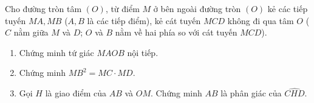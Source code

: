 \begin{ex}%
Cho đường tròn tâm $(O)$, từ điểm $M$ ở bên ngoài đường tròn $(O)$ kẻ các tiếp tuyến $MA, MB$ ($A, B$ là các tiếp điểm), kẻ cát tuyến $MCD$ không đi qua tâm $O$ ($C$ nằm giữa $M$ và $D$; $O$ và $B$ nằm về hai phía so với cát tuyến $MCD$).
\begin{enumerate}
	\item Chứng minh tứ giác $MAOB$ nội tiếp.
	\item Chứng minh $MB^2=MC \cdot MD$.
	\item Gọi $H$ là giao điểm của $AB$ và $OM$. Chứng minh $AB$ là phân giác của $\widehat{CHD}$.
\end{enumerate}	
	\loigiai
	{
\begin{center}
\end{center}}
\end{ex}
